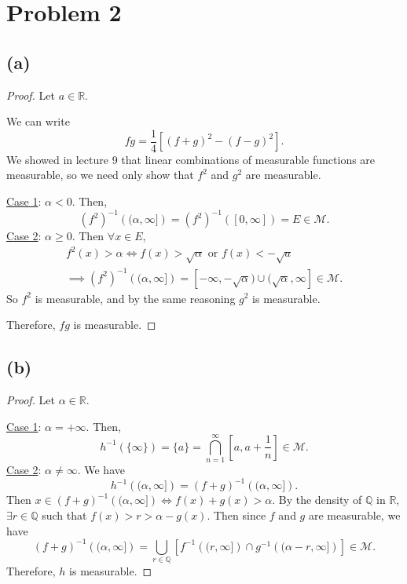 \documentclass{article}
\newcommand{\R}{\mathbb{R}} %
\newcommand{\M}{\mathcal{M}} %
\newcommand{\Q}{\mathbb{Q}} %
\begin{document}
\section*{Problem 2}
\subsection*{(a)}
\begin{proof}
	Let $a \in \R$.
	
	We can write
	\begin{equation}
		fg = \frac{1}{4}\left[(f+g)^2 - (f-g)^2\right].
	\end{equation}
	We showed in lecture 9 that linear combinations of measurable functions are measurable, so we need only show that $f^2$ and $g^2$ are measurable.
	
	\underline{Case 1}: $\alpha < 0$. Then,
	\begin{equation}
		(f^2)^{-1}\left((\alpha, \infty]\right) = (f^2)^{-1}\left([0,\infty]\right) = E \in \M.
	\end{equation}
	\underline{Case 2}: $\alpha \geq 0$. Then $\forall x \in E$,
	\begin{align}
		f^2(x) > \alpha \iff f(x) > \sqrt{\alpha} \textrm{ or } f(x) < -\sqrt{a} \\
		\implies (f^2)^{-1}\left((\alpha, \infty]\right) = [-\infty, -\sqrt{\alpha}) \cup (\sqrt{\alpha}, \infty] \in \M.
	\end{align}
	So $f^2$ is measurable, and by the same reasoning $g^2$ is measurable.
	
	Therefore, $fg$ is measurable.
\end{proof}

\subsection*{(b)}
\begin{proof}
	Let $\alpha \in \R$.
	
	\underline{Case 1}: $\alpha = +\infty$. Then,
	\begin{equation}
		h^{-1}(\{\infty\}) = \{a\} = \bigcap_{n=1}^{\infty}\left[a, a + \frac{1}{n}\right] \in \M.
	\end{equation}
	\underline{Case 2}: $\alpha \neq \infty$. We have
	\begin{equation}
		h^{-1}\left((\alpha, \infty]\right) = (f+g)^{-1}\left((\alpha, \infty]\right).
	\end{equation}
	Then $x \in (f+g)^{-1}\left((\alpha, \infty]\right) \iff f(x) + g(x) > \alpha$. By the density of $\Q$ in $\R$, $\exists r \in \Q$ such that $f(x) > r > \alpha - g(x)$. Then since $f$ and $g$ are measurable, we have
	\begin{equation}
		(f+g)^{-1}\left((\alpha, \infty]\right) = \bigcup_{r \in \Q} \left[f^{-1}\left((r,\infty]\right) \cap g^{-1}\left((\alpha - r,\infty]\right)\right] \in \M.
	\end{equation}
	Therefore, $h$ is measurable.
\end{proof}
\end{document}
